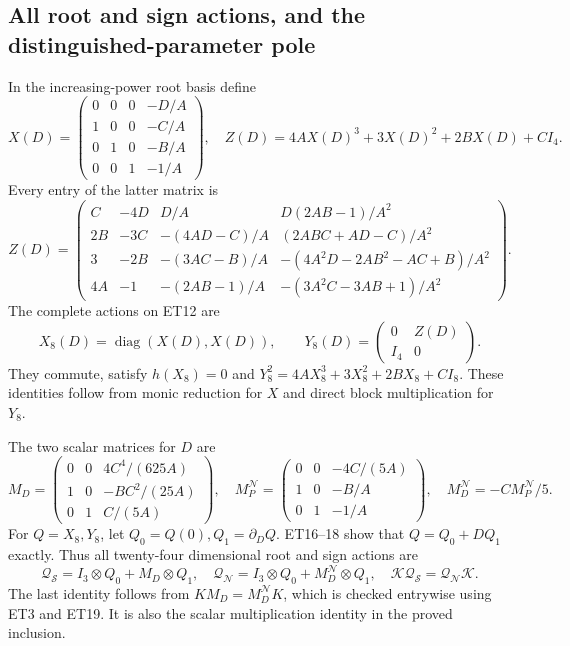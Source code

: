 \documentclass[11pt]{article}
\newcommand{\diag}{\operatorname{diag}}
\begin{document}
\subsection{All root and sign actions, and the distinguished-parameter pole}
In the increasing-power root basis define
\[
 X(D)=\begin{pmatrix}
 0&0&0&-D/A\\1&0&0&-C/A\\0&1&0&-B/A\\0&0&1&-1/A
 \end{pmatrix},\quad
 Z(D)=4AX(D)^3+3X(D)^2+2BX(D)+CI_4.
 \tag{ET16}
\]
Every entry of the latter matrix is
\[
 Z(D)=\begin{pmatrix}
 C&-4D&D/A&D(2AB-1)/A^2\\
 2B&-3C&-(4AD-C)/A&(2ABC+AD-C)/A^2\\
 3&-2B&-(3AC-B)/A&-(4A^2D-2AB^2-AC+B)/A^2\\
 4A&-1&-(2AB-1)/A&-(3A^2C-3AB+1)/A^2
 \end{pmatrix}.
 \tag{ET17}
\]
The complete actions on ET12 are
\[
 X_8(D)=\diag(X(D),X(D)),\qquad
 Y_8(D)=\begin{pmatrix}0&Z(D)\\I_4&0\end{pmatrix}.
 \tag{ET18}
\]
They commute, satisfy $h(X_8)=0$ and
$Y_8^2=4AX_8^3+3X_8^2+2BX_8+CI_8$.
These identities follow from monic reduction for $X$ and direct block
multiplication for $Y_8$.

The two scalar matrices for $D$ are
\[
 M_D=\begin{pmatrix}
 0&0&4C^4/(625A)\\1&0&-BC^2/(25A)\\0&1&C/(5A)
 \end{pmatrix},\quad
 M_P^{\mathscr N}=\begin{pmatrix}
 0&0&-4C/(5A)\\1&0&-B/A\\0&1&-1/A
 \end{pmatrix},\quad M_D^{\mathscr N}=-CM_P^{\mathscr N}/5.
 \tag{ET19}
\]
For $Q=X_8,Y_8$, let $Q_0=Q(0),Q_1=\partial_DQ$.
ET16--18 show that $Q=Q_0+DQ_1$ exactly.
Thus all twenty-four dimensional root and sign actions are
\[
 \mathcal Q_{\mathscr S}=I_3\otimes Q_0+M_D\otimes Q_1,\quad
 \mathcal Q_{\mathscr N}=I_3\otimes Q_0+M_D^{\mathscr N}\otimes Q_1,
 \quad \mathcal K\mathcal Q_{\mathscr S}
 =\mathcal Q_{\mathscr N}\mathcal K .
 \tag{ET20}
\]
The last identity follows from $KM_D=M_D^{\mathscr N}K$,
which is checked entrywise using ET3 and ET19.
It is also the scalar multiplication identity in the proved inclusion.
\end{document}
